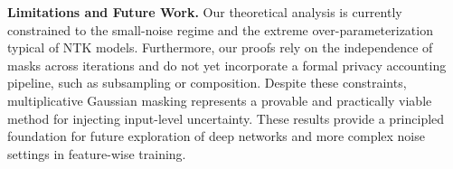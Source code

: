 \documentclass[10pt]{article} %
\theoremstyle{definition}
\theoremstyle{plain}
\begin{document}
\textbf{Limitations and Future Work.} Our theoretical analysis is currently constrained to the small-noise regime and the extreme over-parameterization typical of NTK models. Furthermore, our proofs rely on the independence of masks across iterations and do not yet incorporate a formal privacy accounting pipeline, such as subsampling or composition. Despite these constraints, multiplicative Gaussian masking represents a provable and practically viable method for injecting input-level uncertainty. These results provide a principled foundation for future exploration of deep networks and more complex noise settings in feature-wise training.



\end{document}
